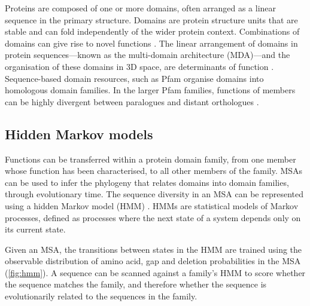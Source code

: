 Proteins are composed of one or more domains, often arranged as a linear sequence in the primary structure. Domains are protein structure units that are stable and can fold independently of the wider protein context. Combinations of domains can give rise to novel functions \cite{Apic2001,Bjorklund2005}. The linear arrangement of domains in protein sequences---known as the multi-domain architecture (MDA)---and the organisation of these domains in $3$D space, are determinants of function \cite{Yu2019,Lees2014,Bashton2007,Dessailly2009}. Sequence-based domain resources, such as Pfam \cite{El-Gebali2019} organise domains into homologous domain families. In the larger Pfam families, functions of members can be highly divergent between paralogues and distant orthologues \cite{Lee2007}.

\subsection{Hidden Markov models}
\label{intro-hmms}

Functions can be transferred within a protein domain family, from one member whose function has been characterised, to all other members of the family. MSAs can be used to infer the phylogeny that relates domains into domain families, through evolutionary time. The sequence diversity in an MSA can be represented using a hidden Markov model (HMM) \cite{Grewal2019,Eddy2004}. HMMs are statistical models of Markov processes, defined as processes where the next state of a system depends only on its current state.

Given an MSA, the transitions between states in the HMM are trained using the observable distribution of amino acid, gap and deletion probabilities in the MSA (\ref{fig:hmm}). A sequence can be scanned against a family's HMM to score whether the sequence matches the family, and therefore whether the sequence is evolutionarily related to the sequences in the family.

